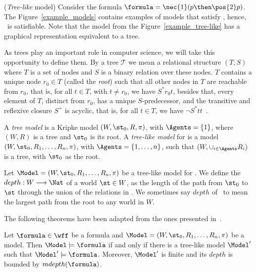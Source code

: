\begin{example}
    \label{ex2}
    (\emph{Tree-like} model) Consider the formula $\formula = \nec{1} (p \then
    \pos{2} p)$. The Figure~\ref{example_models} contains examples of models
    that satisfy \formula, hence, \formula\ is satisfiable. Note that the model
    from the Figure~\ref{example_tree-like} has a graphical representation
    equivalent to a tree. 


 
    As trees play an important role in computer science, we will take this
    opportunity to define them. By a tree $\mathcal{T}$ we mean a relational
    structure $(T, S)$ where $T$ is a set of nodes and $S$ is a binary relation
    over these nodes. $T$ contains a unique node $r_0 \in T$ (called the
    \emph{root}) such that all other nodes in $T$ are reachable from $r_0$, that
    is, for all $t \in T$, with $t \neq r_0$, we have $S^*r_0 t$, besides that,
    every element of $T$, distinct from $r_0$, has a unique $S$-predecessor, and
    the transitive and reflexive closure $S^+$ is acyclic, that is, for all $t
    \in T$, we have $\neg S^* t t$~\cite{areces2000tree}.

    A \emph{tree model} is a Kripke model $(W, \st_0, R, \pi)$, with $\Agents =
    \{1\}$, where $(W, R)$ is a tree and $\st_0$ is its root. A \emph{tree-like
    model} for  is a model $(W, \st_0, R_1, \ldots, R_n, \pi)$,
    with $\Agents = \{1, \ldots, n\}$, such that $(W, \cup_{i \in \Agents} R_i)$
    is a tree, with $\st_0$ as the root.

    Let $\Model = (W, \st_0, R_1, \ldots, R_a, \pi)$ be a tree-like model for
    . We define the $depth: W \longrightarrow \Nat$ of a world
    $\st \in W$, as the length of the path from $\st_0$ to $\st$ through the
    union of the relations in \Model. We sometimes say $depth$ of \Model~to mean
    the largest path from the root to any world in $W$.

    The following theorems have been adapted from the ones presented
    in~\cite{areces2000tree}.

    \begin{theorem}
        \label{theo:tl1}
        Let $\formula \in \wff$ be a formula and $\Model = (W, \st_0, R_1,
        \ldots, R_n, \pi)$ be a model. Then $\Model \models \formula$ if and only if
        there is a tree-like model $\Model'$ such that $\Model' \models \formula$.
        Moreover, $\Model'$ is finite and its $depth$ is bounded by
        $mdepth(\formula)$.
    \end{theorem}


\end{example}
